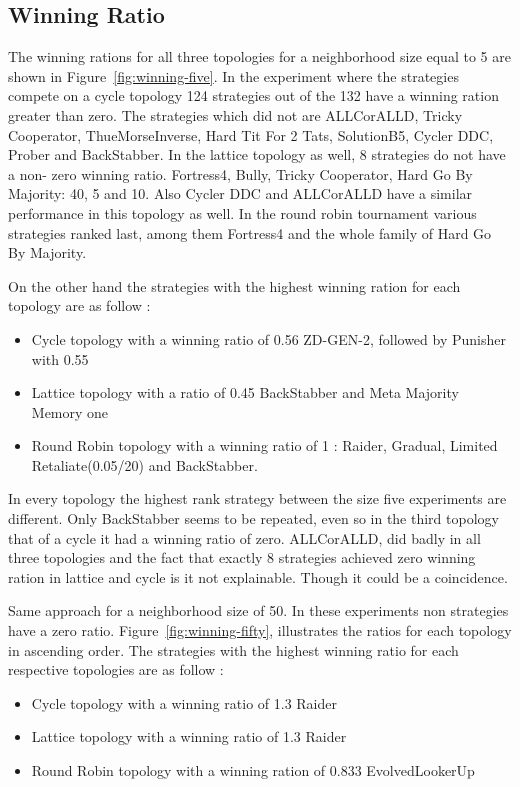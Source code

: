 \subsection{Winning Ratio}
\label{sub:winning-ratio}

The winning rations for all three topologies for a neighborhood size equal to
5 are shown in Figure~\ref{fig:winning-five}. In the experiment where the
strategies compete on a cycle topology 124 strategies out of the 132 have a
winning ration greater than zero. The strategies which did not are ALLCorALLD,
Tricky Cooperator, ThueMorseInverse, Hard Tit For 2 Tats,	SolutionB5, Cycler DDC,
Prober and BackStabber. In the lattice topology as well, 8 strategies do not have
a non- zero winning ratio. Fortress4, Bully, Tricky Cooperator, Hard Go
By Majority: 40, 5 and 10. Also Cycler DDC and ALLCorALLD have a similar
performance in this topology as well.
In the round robin tournament various strategies
ranked last, among them Fortress4 and the whole family of Hard Go By Majority.

On the other hand the strategies with the highest winning ration for each
topology are as follow :
\begin{itemize}
  \item Cycle topology with a winning ratio of 0.56 ZD-GEN-2, followed by Punisher
        with 0.55
  \item Lattice topology with a ratio of 0.45 BackStabber and Meta Majority
        Memory one
  \item Round Robin topology with a winning ratio of 1 : Raider, Gradual, Limited
        Retaliate(0.05/20) and BackStabber.
\end{itemize}

In every topology the highest rank strategy between the size five experiments
are different. Only BackStabber seems to be repeated, even so in the third topology
that of a cycle it had a winning ratio of zero. ALLCorALLD, did badly in all
three topologies and the fact that exactly 8 strategies achieved zero
winning ration in lattice and cycle is it not explainable. Though it could be a
coincidence.

Same approach for a neighborhood size of 50. In these experiments
non strategies have a zero ratio. Figure~\ref{fig:winning-fifty}, illustrates the ratios
for each topology in ascending order. The strategies with the highest winning ratio
for each respective topologies are as follow :

\begin{itemize}
  \item Cycle topology with a winning ratio of 1.3 Raider
  \item Lattice topology with a winning ratio of 1.3 Raider
  \item Round Robin topology with a winning ration of 0.833 EvolvedLookerUp
\end{itemize}

